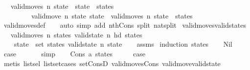 \begin{isabellebody}
\ \ \ {\isachardoublequoteopen}valid{\isacharunderscore}moves\ n\ {\isacharparenleft}state{}\ {\isacharhash}\ state{}\ {\isacharhash}\ states{\isacharparenright}\ {\isasymlongleftrightarrow}\ \isanewline
\ \ \ \ \ \ \ \ \ valid{\isacharunderscore}move\ n\ state{}\ state{}\ {\isasymand}\ valid{\isacharunderscore}moves\ n\ {\isacharparenleft}state{}\ {\isacharhash}\ states{\isacharparenright}{\isachardoublequoteclose}\isanewline
%
\isadelimproof
\ \ %
\endisadelimproof
%
\isatagproof
{}\isamarkupfalse%
\ valid{\isacharunderscore}moves{\isacharunderscore}def\isanewline
\ \ \isamarkupfalse%
\ {\isacharparenleft}auto\ simp\ add{\isacharcolon}\ nth{\isacharunderscore}Cons\ split{\isacharcolon}\ nat{\isachardot}split{\isacharparenright}%
\endisatagproof
{\isafoldproof}%
%
\isadelimproof
\isanewline
%
\endisadelimproof
\isanewline
{}\isamarkupfalse%
\ valid{\isacharunderscore}moves{\isacharunderscore}valid{\isacharunderscore}states{\isacharcolon}\isanewline
\ \ \ {\isachardoublequoteopen}valid{\isacharunderscore}moves\ n\ states{\isachardoublequoteclose}\ {\isachardoublequoteopen}valid{\isacharunderscore}state\ n\ {\isacharparenleft}hd\ states{\isacharparenright}{\isachardoublequoteclose}\isanewline
\ \ \ {\isachardoublequoteopen}{\isasymforall}\ state\ {\isasymin}\ set\ states{\isachardot}\ valid{\isacharunderscore}state\ n\ state{\isachardoublequoteclose}\isanewline
%
\isadelimproof
\ \ %
\endisadelimproof
%
\isatagproof
{}\isamarkupfalse%
\ assms\isanewline
{}\isamarkupfalse%
\ {\isacharparenleft}induction\ states{\isacharparenright}\isanewline
\ \ \isamarkupfalse%
\ Nil\isanewline
\ \ \isamarkupfalse%
\ \isamarkupfalse%
\ {\isacharquery}case\ \isanewline
\ \ \ \ \isamarkupfalse%
\ simp\isanewline
{}\isamarkupfalse%
\isanewline
\ \ \isamarkupfalse%
\ {\isacharparenleft}Cons\ a\ states{\isacharparenright}\isanewline
\ \ \isamarkupfalse%
\ \isamarkupfalse%
\ {\isacharquery}case\isanewline
\ \ \ \ \isamarkupfalse%
\ {\isacharparenleft}metis\ list{\isachardot}sel{\isacharparenleft}{}{\isacharparenright}\ list{\isachardot}set{\isacharunderscore}cases\ set{\isacharunderscore}ConsD\ valid{\isacharunderscore}moves{\isacharunderscore}Cons\ valid{\isacharunderscore}move{\isacharunderscore}valid{\isacharunderscore}state{\isacharparenright}\isanewline

\end{isabellebody}
